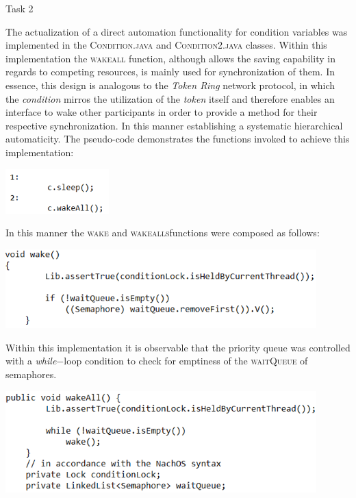 \documentclass[12pt]{article}
\begin{document}
{ \begin{center}Task 2\end{center} 
The actualization of a direct automation functionality for condition variables was implemented in the \textsc{Condition.java} and \textsc{Condition2.java} classes. Within this implementation  the \textsc{wakeall} function, although allows the saving capability in regards to competing resources, is mainly used for synchronization of them. In essence, this design is analogous to the \textit{Token Ring} network protocol, in which the \textit{condition} mirros the utilization of the \textit{token} itself and therefore enables an interface to wake other participants in order to provide a method for their respective synchronization. In this manner establishing a systematic hierarchical automaticity. The pseudo-code demonstrates the functions invoked to achieve this implementation:
\begin{center} \includegraphics[width=40mm]{pic2.png} \end{center}
In this manner the \textsc{wake} and \textsc{wakealls}functions were composed as follows:
\begin{center}\includegraphics[width=120mm]{pic6.png}\end{center}
Within this implementation it is observable that the priority queue was controlled with a \textit{while}$-$loop condition to check for emptiness of the \textsc{waitQueue} of semaphores.
\begin{center}\includegraphics[width=120mm]{pic7.png}\end{center}
}
\end{document}
